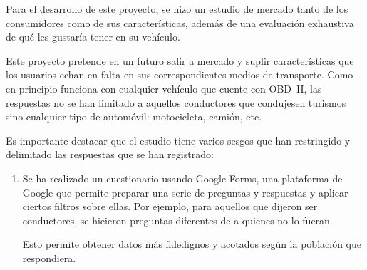 Para el desarrollo de este proyecto, se hizo un estudio de mercado tanto de los
consumidores como de sus características, además de una evaluación exhaustiva
de qué les gustaría tener en su vehículo.

Este proyecto pretende en un futuro salir a mercado y suplir características que los
usuarios echan en falta en sus correspondientes medios de transporte. Como en principio
funciona con cualquier vehículo que cuente con \ac{OBD}--II, las respuestas no se han
limitado a aquellos conductores que condujesen turismos sino cualquier tipo de
automóvil: motocicleta, camión, etc.

Es importante destacar que el estudio tiene varios sesgos que han restringido
y delimitado las respuestas que se han registrado:

\begin{enumerate}
  \item Se ha realizado un cuestionario usando Google Forms, una plataforma de Google
        que permite preparar una serie de preguntas y respuestas y aplicar ciertos
        filtros sobre ellas. Por ejemplo, para aquellos que dijeron ser conductores,
        se hicieron preguntas diferentes de a quienes no lo fueran.

        Esto permite obtener datos más fidedignos y acotados según la población que
        respondiera.
\end{enumerate}
